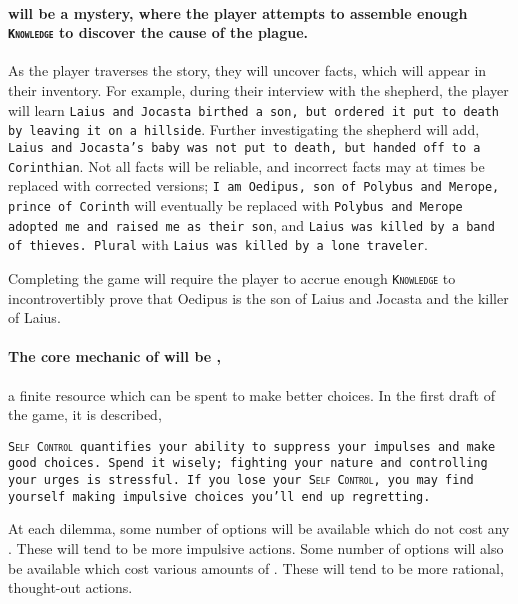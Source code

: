 \newcommand{\knowledge}{\texttt{\textsc{Knowledge}}}

\paragraph*{\thegame{} will be a mystery, where the player attempts to assemble enough
  \knowledge{} to discover the cause of the plague.} As the player traverses the story,
they will uncover facts, which will appear in their inventory. For example, during their
interview with the shepherd, the player will learn \texttt{Laius and Jocasta birthed a
  son, but ordered it put to death by leaving it on a hillside}. Further investigating the
shepherd will add, \texttt{Laius and Jocasta's baby was not put to death, but handed off
  to a Corinthian}. Not all facts will be reliable, and incorrect facts may at times be
replaced with corrected versions; \texttt{I am Oedipus, son of Polybus and Merope, prince
  of Corinth} will eventually be replaced with \texttt{Polybus and Merope adopted me and
  raised me as their son}, and \texttt{Laius was killed by a band of thieves. Plural} with
\texttt{Laius was killed by a lone traveler}.

Completing the game will require the player to accrue enough \knowledge{} to
incontrovertibly prove that Oedipus is the son of Laius and Jocasta and the killer of
Laius.

\paragraph*{The core mechanic of \thegame{} will be \selfcontrol{}, } a finite resource
which can be spent to make better choices. In the first draft of the game, it is
described,

\newcommand{\gamequote}[1]{
  \begin{minipage}[t]{0.8\linewidth}
    \texttt{#1}
  \end{minipage}
  \vspace{\baselineskip}
}

\gamequote{\textsc{Self Control} quantifies your ability to suppress your impulses and
  make good choices. Spend it wisely; fighting your nature and controlling your urges is
  stressful. If you lose your \textsc{Self Control}, you may find yourself making
  impulsive choices you'll end up regretting.}

At each dilemma, some number of options will be available which do not cost any
\selfcontrol{}. These will tend to be more impulsive actions. Some number of options will
also be available which cost various amounts of \selfcontrol{}. These will tend to be more
rational, thought-out actions.

